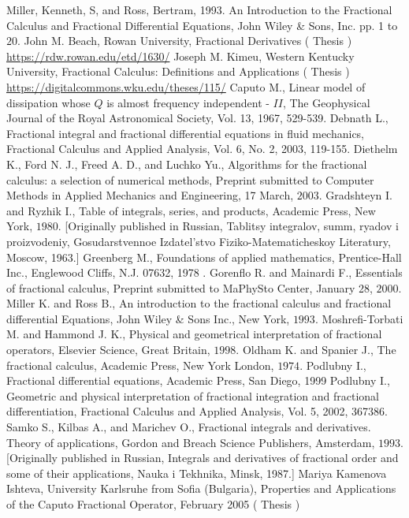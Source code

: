 \documentclass[a4paper,14pt,oneside]{book}
\theoremstyle{plain}
\theoremstyle{definition}
\theoremstyle{remark}
\begin{document}
\begin{center}
{\begin{thebibliography}{99}
 Miller, Kenneth, S, and Ross, Bertram, 1993. An Introduction to the Fractional Calculus and Fractional Differential Equations, John Wiley \& Sons, Inc. pp. 1 to $20 .$
 John M. Beach, Rowan University, Fractional Derivatives ( Thesis ) \url{https://rdw.rowan.edu/etd/1630/} %
 Joseph M. Kimeu, Western Kentucky University, Fractional Calculus: Definitions and Applications ( Thesis ) \\
\url{https://digitalcommons.wku.edu/theses/115/} %
 Caputo M., Linear model of dissipation whose $Q$ is almost frequency independent - $I I$, The Geophysical Journal of the Royal Astronomical Society, Vol. 13, 1967, 529-539.
Debnath L., Fractional integral and fractional differential equations in fluid mechanics, Fractional Calculus and Applied Analysis, Vol. 6, No. 2, 2003, 119-155.
 Diethelm K., Ford N. J., Freed A. D., and Luchko Yu., Algorithms for the fractional calculus: a selection of numerical methods, Preprint submitted to Computer Methods in Applied Mechanics and Engineering, 17 March, $2003 .$
Gradshteyn I. and Ryzhik I., Table of integrals, series, and products, Academic Press, New York, $1980 .$
[Originally published in Russian, Tablitsy integralov, summ, ryadov i proizvodeniy, Gosudarstvennoe Izdatel'stvo Fiziko-Matematicheskoy Literatury, Moscow, 1963.]
Greenberg M., Foundations of applied mathematics, Prentice-Hall Inc., Englewood Cliffs, N.J. 07632, 1978 .
Gorenflo R. and Mainardi F., Essentials of fractional calculus, Preprint submitted to MaPhySto Center, January 28, $2000 .$
Miller K. and Ross B., An introduction to the fractional calculus and fractional differential Equations, John Wiley \& Sons Inc., New York, $1993.$
 Moshrefi-Torbati M. and Hammond J. K., Physical and geometrical interpretation of fractional operators, Elsevier Science, Great Britain, $1998 .$
Oldham K. and Spanier J., The fractional calculus, Academic Press, New York London, $1974 .$
Podlubny I., Fractional differential equations, Academic Press, San Diego, 1999
Podlubny I., Geometric and physical interpretation of fractional integration and fractional differentiation, Fractional Calculus and Applied Analysis, Vol. 5, 2002, 367386.
Samko S., Kilbas A., and Marichev O., Fractional integrals and derivatives. Theory of applications, Gordon and Breach Science Publishers, Amsterdam, $1993 .$
[Originally published in Russian, Integrals and derivatives of fractional order and some of their applications, Nauka i Tekhnika, Minsk, 1987.]
Mariya Kamenova Ishteva, University Karlsruhe from Sofia (Bulgaria), Properties and Applications of the Caputo Fractional Operator, February 2005 ( Thesis )\\
\end{thebibliography}}
       \end{center}
\end{document}
